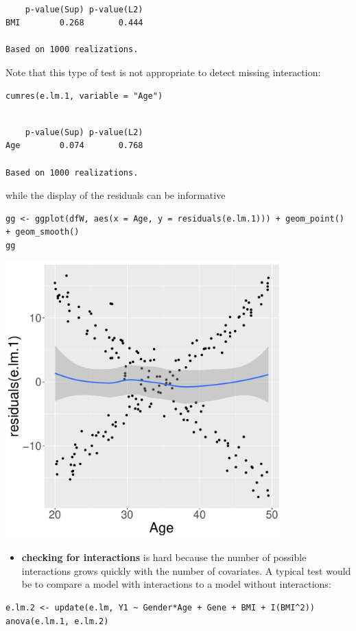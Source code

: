 \documentclass[12pt]{article}
\begin{document}
\begin{verbatim}

    p-value(Sup) p-value(L2)
BMI        0.268       0.444

Based on 1000 realizations.
\end{verbatim}
Note that this type of test is not appropriate to detect missing
interaction:
\lstset{language=r,label= ,caption= ,captionpos=b,numbers=none}
\begin{lstlisting}
cumres(e.lm.1, variable = "Age")
\end{lstlisting}

\begin{verbatim}

    p-value(Sup) p-value(L2)
Age        0.074       0.768

Based on 1000 realizations.
\end{verbatim}
while the display of the residuals can be informative
\lstset{language=r,label= ,caption= ,captionpos=b,numbers=none}
\begin{lstlisting}
gg <- ggplot(dfW, aes(x = Age, y = residuals(e.lm.1))) + geom_point() + geom_smooth()
gg
\end{lstlisting}


\begin{center}
\includegraphics[width=0.8\textwidth]{./figures/A1-Age.pdf}
\end{center} 

\begin{itemize}
\item \textbf{checking for interactions} is hard because the number of possible
interactions grows quickly with the number of covariates. A typical
test would be to compare a model with interactions to a model
without interactions:
\end{itemize}
\lstset{language=r,label= ,caption= ,captionpos=b,numbers=none}
\begin{lstlisting}
e.lm.2 <- update(e.lm, Y1 ~ Gender*Age + Gene + BMI + I(BMI^2))
anova(e.lm.1, e.lm.2)
\end{lstlisting}
\end{document}
